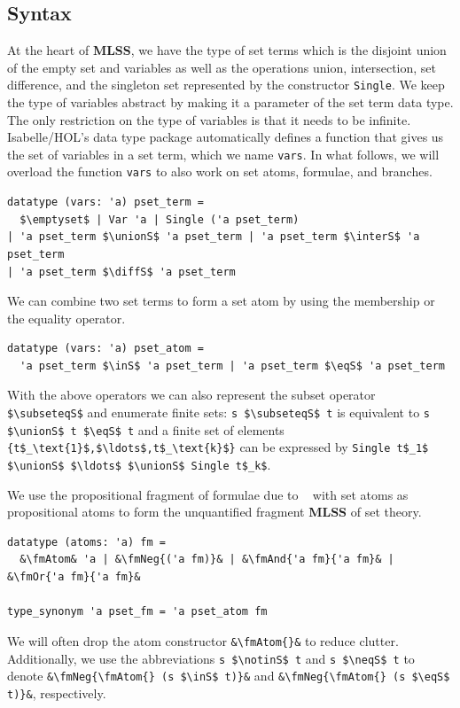 \documentclass[runningheads]{llncs}
\newcommand{\MLSS}{\textbf{MLSS}}
\newcommand{\unionS}{\sqcup_\text{s}}
\newcommand{\interS}{\sqcap_\text{s}}
\newcommand{\diffS}{-_\text{s}}
\newcommand{\inS}{\in_\text{s}}
\newcommand{\notinS}{\notin_\text{s}}
\newcommand{\eqS}{=_\text{s}}
\newcommand{\neqS}{\neq_\text{s}}
\newcommand{\subseteqS}{\sqsubseteq_\text{s}}
\newcommand{\fmAndSymbol}{\boldsymbol{\land}}
\newcommand{\fmAnd}[2]{#1 $\fmAndSymbol$ #2}
\newcommand{\fmOr}[2]{#1 $\boldsymbol{\lor}$ #2}
\newcommand{\fmNegSymbol}{\boldsymbol{\neg}}
\newcommand{\fmNeg}[1]{$\fmNegSymbol\:$#1}
\newcommand{\fmAtom}{\textbf{A}}
\begin{document}
\subsection{Syntax}
At the heart of \MLSS{}, we have the type of set terms which is the disjoint union of the empty set and variables as well as the operations union, intersection, set difference, and the singleton set represented by the constructor \lstinline!Single!.
We keep the type of variables abstract by making it a parameter of the set term data type.
The only restriction on the type of variables is that it needs to be infinite.
Isabelle/HOL's data type package automatically defines a function that gives us the set of variables in a set term, which we name \lstinline!vars!.
In what follows, we will overload the function \lstinline!vars! to also work on set atoms, formulae, and branches.
\begin{lstlisting}
datatype (vars: 'a) pset_term =
  $\emptyset$ | Var 'a | Single ('a pset_term)
| 'a pset_term $\unionS$ 'a pset_term | 'a pset_term $\interS$ 'a pset_term
| 'a pset_term $\diffS$ 'a pset_term
\end{lstlisting}
We can combine two set terms to form a set atom by using the membership or the equality operator.
\begin{lstlisting}
datatype (vars: 'a) pset_atom =
  'a pset_term $\inS$ 'a pset_term | 'a pset_term $\eqS$ 'a pset_term
\end{lstlisting}
With the above operators we can also represent the subset operator \lstinline!$\subseteqS$! and enumerate finite sets: \lstinline!s $\subseteqS$ t! is equivalent to \lstinline!s $\unionS$ t $\eqS$ t! and a finite set of elements \lstinline!{t$_\text{1}$,$\ldots$,t$_\text{k}$}! can be expressed by \lstinline!Single t$_1$ $\unionS$ $\ldots$ $\unionS$ Single t$_k$!.

We use the propositional fragment of formulae due to \citeauthor{lqe}~\cite{lqe} with set atoms as propositional atoms to form the unquantified fragment \MLSS{} of set theory.
\begin{lstlisting}
datatype (atoms: 'a) fm =
  &\fmAtom& 'a | &\fmNeg{('a fm)}& | &\fmAnd{'a fm}{'a fm}& | &\fmOr{'a fm}{'a fm}&

type_synonym 'a pset_fm = 'a pset_atom fm
\end{lstlisting}
We will often drop the atom constructor \lstinline!&\fmAtom{}&! to reduce clutter.
Additionally, we use the abbreviations \lstinline!s $\notinS$ t! and \lstinline!s $\neqS$ t! to denote \lstinline!&\fmNeg{\fmAtom{} (s $\inS$ t)}&! and \lstinline!&\fmNeg{\fmAtom{} (s $\eqS$ t)}&!, respectively.
\end{document}
